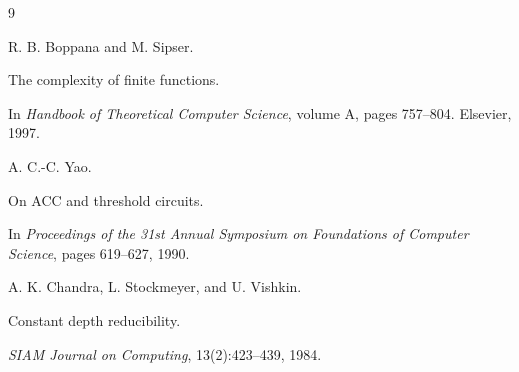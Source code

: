 \documentclass[11pt]{article}
\theoremstyle{definition}
\begin{document}
\begin{thebibliography}{9}






R. B. Boppana and M. Sipser.






The complexity of finite functions.






In \textit{Handbook of Theoretical Computer Science}, volume A, pages 757–804. Elsevier, 1997.



















A. C.-C. Yao.






On ACC and threshold circuits.






In \textit{Proceedings of the 31st Annual Symposium on Foundations of Computer Science}, pages 619–627, 1990.



















A. K. Chandra, L. Stockmeyer, and U. Vishkin.






Constant depth reducibility.






\textit{SIAM Journal on Computing}, 13(2):423–439, 1984.






















\end{thebibliography}
\end{document}
